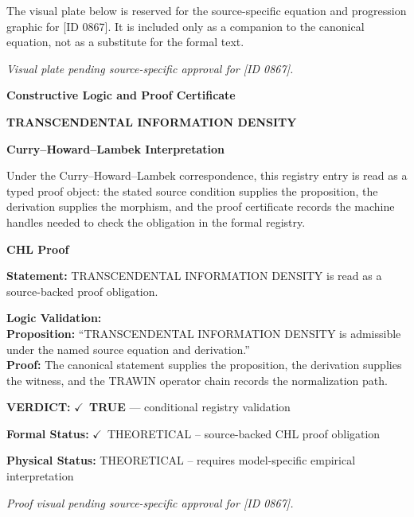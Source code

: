 \begingroup\footnotesize\sloppy
The visual plate below is reserved for the source-specific equation and progression graphic for [ID 0867]. It is included only as a companion to the canonical equation, not as a substitute for the formal text.
\par\endgroup
\begingroup\footnotesize\itshape
Visual plate pending source-specific approval for [ID 0867].
\par\endgroup

\clearpage
\begingroup\tzpsupportsetup
\noindent\textbf{\fontsize{10.8pt}{12.8pt}\selectfont [ID 0867] Constructive Logic and Proof Certificate}\par
\noindent\textbf{\fontsize{10pt}{12pt}\selectfont TRANSCENDENTAL INFORMATION DENSITY}\par
\vspace{0.45em}
\begingroup
\footnotesize
\setlength{\parskip}{0.22em}
\setlength{\parindent}{0pt}
\noindent\textbf{Curry--Howard--Lambek Interpretation}\par
Under the Curry--Howard--Lambek correspondence, this registry entry is read as a typed proof
object: the stated source condition supplies the proposition, the derivation supplies the
morphism, and the proof certificate records the machine handles needed to check the obligation
in the formal registry.

\vspace{0.45em}
\noindent\textbf{CHL Proof}\par
\textbf{Statement:} TRANSCENDENTAL INFORMATION DENSITY is read as a source-backed proof obligation.

\textbf{Logic Validation:}\\
\textbf{Proposition:} ``TRANSCENDENTAL INFORMATION DENSITY is admissible under the named source equation and derivation.''\\
\textbf{Proof:} The canonical statement supplies the proposition, the derivation supplies the witness, and the TRAWIN operator chain records the normalization path.

\textbf{VERDICT:} \ensuremath{\checkmark}\ \textbf{TRUE} --- conditional registry validation

\textbf{Formal Status:} \ensuremath{\checkmark}\ THEORETICAL -- source-backed CHL proof obligation

\textbf{Physical Status:} THEORETICAL -- requires model-specific empirical interpretation
\par\vspace{0.45em}
\par
\vfill
\begingroup\footnotesize\itshape
Proof visual pending source-specific approval for [ID 0867].
\par\endgroup
\vfill
\endgroup
\endgroup
